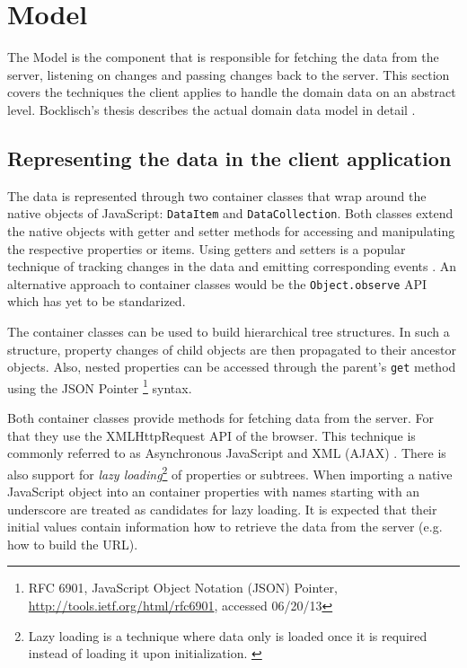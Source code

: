 \section{Model}

The Model is the component that is responsible for fetching the data from the server, listening on changes and passing changes back to the server. This section covers the techniques the client applies to handle the domain data on an abstract level. Bocklisch's thesis describes the actual domain data model in detail \cite{Bocklisch_2013}.

\subsection{Representing the data in the client application}

The data is represented through two container classes that wrap around the native objects of JavaScript: \texttt{DataItem} and \texttt{DataCollection}. Both classes extend the native objects with getter and setter methods for accessing and manipulating the respective properties or items. Using getters and setters is a popular technique of tracking changes in the data and emitting corresponding events \cite{Osmani_2013}. An alternative approach to container classes would be the \texttt{Object.observe} API \cite{Waldron_2012} which has yet to be standarized.

The container classes can be used to build hierarchical tree structures. In such a structure, property changes of child objects are then propagated to their ancestor objects. Also, nested properties can be accessed through the parent's \texttt{get} method using the JSON Pointer \footnote{RFC 6901, JavaScript Object Notation (JSON) Pointer, \url{http://tools.ietf.org/html/rfc6901}, accessed 06/20/13} syntax.

Both container classes provide methods for fetching data from the server. For that they use the XMLHttpRequest \cite{W3C_XHR} API of the browser. This technique is commonly referred to as Asynchronous JavaScript and XML (AJAX) \cite{Garrett_2005}. There is also support for \textit{lazy loading}\footnote{Lazy loading is a technique where data only is loaded once it is required instead of loading it upon initialization. \cite{Fowler_2002}} of properties or subtrees. When importing a native JavaScript object into an container properties with names starting with an underscore are treated as candidates for lazy loading. It is expected that their initial values contain information how to retrieve the data from the server (e.g. how to build the URL).

